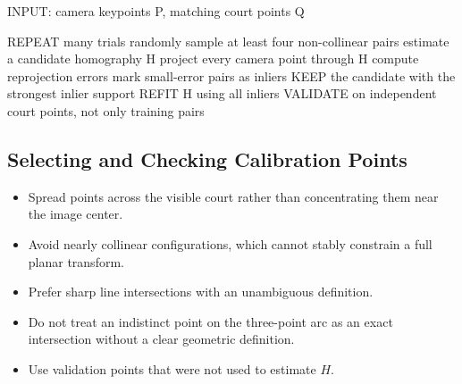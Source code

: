 \documentclass[11pt,a4paper,oneside]{report}
\begin{document}
\begin{pseudoBox}
INPUT: camera keypoints P, matching court points Q

REPEAT many trials
  randomly sample at least four non-collinear pairs
  estimate a candidate homography H
  project every camera point through H
  compute reprojection errors
  mark small-error pairs as inliers
KEEP the candidate with the strongest inlier support
REFIT H using all inliers
VALIDATE on independent court points, not only training pairs
\end{pseudoBox}

\subsection{Selecting and Checking Calibration Points}

\begin{itemize}
  \item Spread points across the visible court rather than concentrating them near the image center.
  \item Avoid nearly collinear configurations, which cannot stably constrain a full planar transform.
  \item Prefer sharp line intersections with an unambiguous definition.
  \item Do not treat an indistinct point on the three-point arc as an exact intersection without a clear geometric definition.
  \item Use validation points that were not used to estimate $H$.
\end{itemize}
\end{document}
